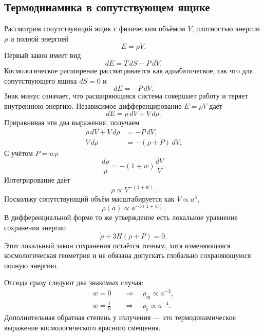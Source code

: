 \subsection{Термодинамика в сопутствующем ящике}

Рассмотрим сопутствующий ящик с физическим объёмом \(V\), плотностью энергии \(\rho\) и полной энергией
\begin{equation}
E=\rho V.
\end{equation}
Первый закон имеет вид
\begin{equation}
dE=T\,dS-P\,dV.
\end{equation}
Космологическое расширение рассматривается как адиабатическое, так что для сопутствующего ящика \(dS=0\) и
\begin{equation}
dE=-P\,dV.
\label{eq:c04-adiabatic-first-law}
\end{equation}
Знак минус означает, что расширяющаяся система совершает работу и теряет внутреннюю энергию. Независимое дифференцирование \(E=\rho V\) даёт
\begin{equation}
dE=\rho\,dV+V\,d\rho.
\end{equation}
Приравнивая эти два выражения, получаем
\begin{align}
\rho\,dV+V\,d\rho&=-P\,dV,\\
V\,d\rho&=-(\rho+P)\,dV.
\label{eq:c04-volume-continuity}
\end{align}
С учётом \(P=w\rho\)
\begin{equation}
\frac{d\rho}{\rho}=-(1+w)\frac{dV}{V}.
\end{equation}
Интегрирование даёт
\begin{equation}
\rho\propto V^{-(1+w)}.
\end{equation}
Поскольку сопутствующий объём масштабируется как \(V\propto a^3\),
\begin{equation}
\boxed{\rho(a)\propto a^{-3(1+w)}}.
\label{eq:c04-density-scaling}
\end{equation}
В дифференциальной форме то же утверждение есть локальное уравнение сохранения энергии
\begin{equation}
\dot\rho+3H(\rho+P)=0.
\label{eq:c04-continuity}
\end{equation}
Этот локальный закон сохранения остаётся точным, хотя изменяющаяся космологическая геометрия и не обязана допускать глобально сохраняющуюся полную энергию.

Отсюда сразу следуют два знакомых случая:
\begin{align}
w=0
&\quad\Longrightarrow\quad
\rho_{\mathrm m}\propto a^{-3},\\
w=\frac13
&\quad\Longrightarrow\quad
\rho_{\mathrm r}\propto a^{-4}.
\end{align}
Дополнительная обратная степень у излучения — это термодинамическое выражение космологического красного смещения.

